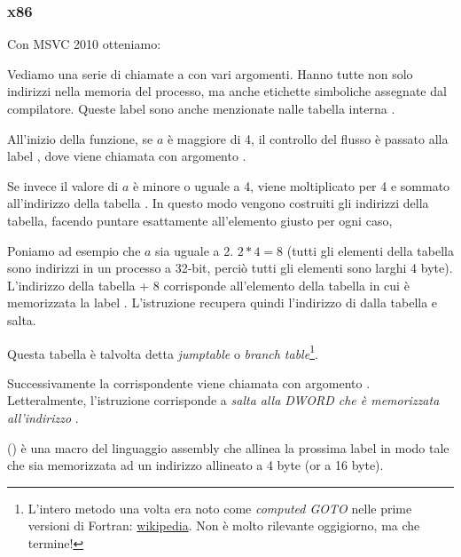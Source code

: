 \subsubsection{x86}


Con MSVC 2010 otteniamo:




Vediamo una serie di chiamate a \printf con vari argomenti. Hanno tutte non solo indirizzi nella memoria del processo, ma anche etichette
simboliche assegnate dal compilatore. Queste label sono anche menzionate nalle tabella interna .

All'inizio della funzione, se $a$ è maggiore di 4, il controllo del flusso è passato alla label 
, dove viene chiamata \printf con argomento .

Se invece il valore di $a$ è minore o uguale a 4, viene moltiplicato per 4 e sommato all'indirizzo della tabella . 
In questo modo vengono costruiti gli indirizzi della tabella, facendo puntare esattamente all'elemento giusto per ogni caso,

Poniamo ad esempio che $a$ sia uguale a 2. $2*4 = 8$ (tutti gli elementi della tabella sono indirizzi in un processo a 32-bit, perciò tutti gli elementi sono larghi 4 byte).
L'indirizzo della tabella  + 8 corrisponde all'elemento della tabella in cui è memorizzata la label .
L'istruzione \JMP recupera quindi l'indirizzo di  dalla tabella e salta.

Questa tabella è talvolta detta \emph{jumptable} o \emph{branch table}\footnote{L'intero metodo una volta era noto come 
\emph{computed GOTO} nelle prime versioni di Fortran:
\href{http://go.yurichev.com/17122}{wikipedia}.
Non è molto rilevante oggigiorno, ma che termine!}.

Successivamente la corrispondente \printf viene chiamata con argomento .\\
Letteralmente, l'istruzione  corrisponde a 
\emph{salta alla DWORD che è memorizzata all'indirizzo} .

 () è una macro del linguaggio assembly che allinea la prossima label in modo tale che sia memorizzata 
ad un indirizzo allineato a 4 byte (or a 16 byte).

